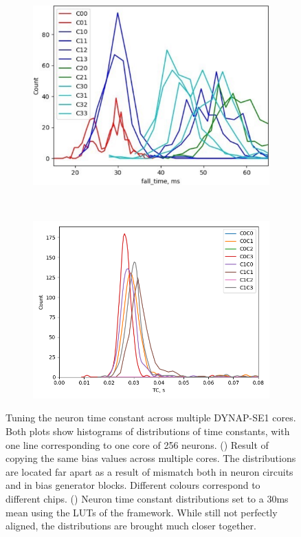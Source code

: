 \begin{figure}[b!]
\centering
  \begin{subfigure}{.6\textwidth}
    \includegraphics[width=\textwidth]{img/chapter2/cores_TCs_same_bias.png}
    \subcaption{}
    \label{fig:TCs_same_bias}
  \end{subfigure}\\
  \centering
  \begin{subfigure}{.65\textwidth}
    \includegraphics[width=\textwidth]{img/chapter2/taus_tuned_to_30ms_dist_new.png}
    \subcaption{}
    \label{fig:TCs_same_mean}
  \end{subfigure}
  \caption[The result of using the tuning framework to align the time constants across multiple cores of the DYNAP-SE1 chip.]{Tuning the neuron time constant across multiple DYNAP-SE1 cores. Both plots show histograms of distributions of time constants, with one line corresponding to one core of 256 neurons. () Result of copying the same bias values across multiple cores. The distributions are located far apart as a result of mismatch both in neuron circuits and in bias generator blocks. Different colours correspond to different chips. () Neuron time constant distributions set to a 30ms mean using the LUTs of the  framework. While still not perfectly aligned, the distributions are brought much closer together.}

\end{figure}
